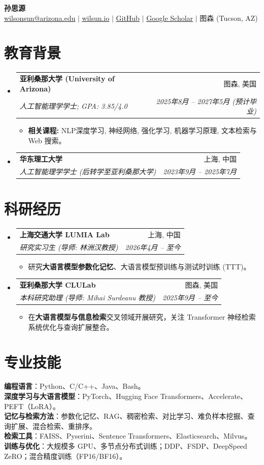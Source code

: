 \documentclass[letterpaper,11pt]{article}
\makeatletter
\newcommand{\resumeItem}[1]{
  \item\small{
    {#1 \vspace{-2pt}}
  }
}
\newcommand{\resumeSubheading}[4]{
  \vspace{-2pt}\item
    \begin{tabular*}{0.97\textwidth}[t]{l@{\extracolsep{\fill}}r}
      \textbf{#1} & #2 \\
      \textit{\small#3} & \textit{\small #4} \\
    \end{tabular*}\vspace{-7pt}
}
\newcommand{\resumeSubHeadingListStart}{\begin{itemize}[leftmargin=0.15in, label={}]}
\newcommand{\resumeSubHeadingListEnd}{\end{itemize}}
\newcommand{\resumeItemListStart}{\begin{itemize}[leftmargin=0.2in]}
\newcommand{\resumeItemListEnd}{\end{itemize}\vspace{-5pt}}
\makeatother
\begin{document}
\begin{center}
    {\Huge \textbf{孙思源}} \\ \vspace{4pt}
    \small \href{mailto:wilsonsun@arizona.edu}{\underline{wilsonsun@arizona.edu}} $|$
    \href{https://wilsun.io}{\underline{wilsun.io}} $|$
    \href{https://github.com/ws-uofa}{\underline{GitHub}} $|$
    \href{https://scholar.google.com/citations?user=6xnACBMAAAAJ}{\underline{Google Scholar}} $|$
    \small 图森 (Tucson, AZ)
\end{center}

\section{教育背景}
  \resumeSubHeadingListStart
    \resumeSubheading
      {亚利桑那大学 (University of Arizona)}{图森, 美国}
      {人工智能理学学士; GPA: 3.85/4.0}{2025年8月 -- 2027年5月 (预计毕业)}
      \resumeItemListStart
        \resumeItem{\textbf{相关课程:} NLP深度学习, 神经网络, 强化学习, 机器学习原理, 文本检索与 Web 搜索。}
      \resumeItemListEnd
    \resumeSubheading
      {华东理工大学}{上海, 中国}
      {人工智能理学学士 (后转学至亚利桑那大学)}{2023年9月 -- 2025年7月}
  \resumeSubHeadingListEnd

\section{科研经历}
  \resumeSubHeadingListStart
    \resumeSubheading
      {上海交通大学 LUMIA Lab}{上海, 中国}
      {研究实习生 (导师: 林洲汉教授)}{2026年4月 -- 至今}
      \resumeItemListStart
        \resumeItem{研究\textbf{大语言模型参数化记忆}、大语言模型预训练与测试时训练 (TTT)。}
      \resumeItemListEnd
    \resumeSubheading
      {亚利桑那大学 CLULab}{图森, 美国}
      {本科研究助理 (导师: Mihai Surdeanu 教授)}{2025年9月 -- 至今}
      \resumeItemListStart
        \resumeItem{在\textbf{大语言模型与信息检索}交叉领域开展研究，关注 Transformer 神经检索系统优化与查询扩展整合。}
      \resumeItemListEnd
  \resumeSubHeadingListEnd

\section{专业技能}
 \begin{itemize}[leftmargin=0.15in, label={}]
    \small{\item{
     \textbf{编程语言}{：Python、C/C++、Java、Bash。} \\
     \textbf{深度学习与大语言模型}{：PyTorch、Hugging Face Transformers、Accelerate、PEFT（LoRA）。} \\
     \textbf{记忆与检索方法}{：参数化记忆、RAG、稠密检索、对比学习、难负样本挖掘、查询扩展、混合检索、重排序。} \\
     \textbf{检索工具}{：FAISS、Pyserini、Sentence Transformers、Elasticsearch、Milvus。} \\
     \textbf{训练与优化}{：大规模多 GPU、多节点分布式训练；DDP、FSDP、DeepSpeed ZeRO；混合精度训练（FP16/BF16）。}
    }}
 \end{itemize}
\end{document}
